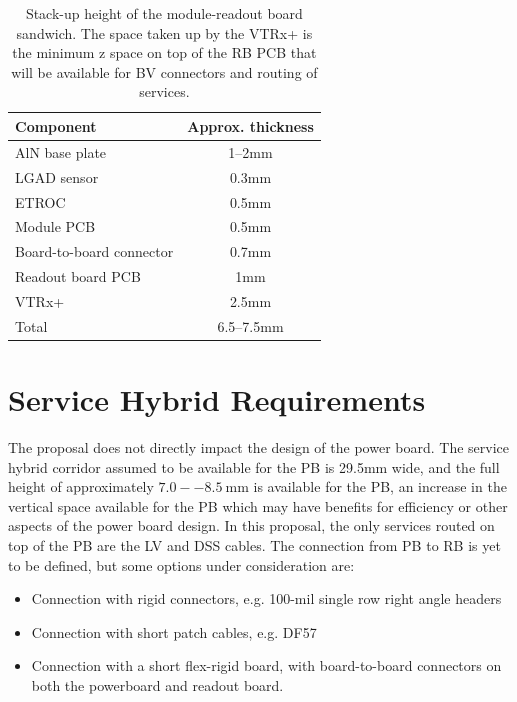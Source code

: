 \documentclass[11pt]{article}
\begin{document}
\begin{table}
  \caption{Stack-up height of the module-readout board sandwich.
    The space taken up by the VTRx+ is the minimum z space on top of the RB PCB that will be available for BV connectors and routing of services.}
  \centering
  \begin{tabular}{ l | c }
    Component                   & Approx. thickness \\ \hline \hline
    AlN base plate              & 1--2mm \\
    LGAD sensor                 & 0.3mm \\
    ETROC                       & 0.5mm \\
    Module PCB                  & 0.5mm \\
    Board-to-board connector    & 0.7mm \\
    Readout board PCB           & 1mm \\
    VTRx+                       & 2.5mm \\ \hline
    Total                       & 6.5--7.5mm \\
  \end{tabular}
  \label{tab:stackup}
\end{table}

\section{Service Hybrid Requirements}

The proposal does not directly impact the design of the power board.
The service hybrid corridor assumed to be available for the PB is 29.5mm wide, and the full height of approximately $7.0--8.5~\mathrm{mm}$ is available for the PB, an increase in the vertical space available for the PB which may have benefits for efficiency or other aspects of the power board design.
In this proposal, the only services routed on top of the PB are the LV and DSS cables.
The connection from PB to RB is yet to be defined, but some options under consideration are:
\begin{itemize}
  \item Connection with rigid connectors, e.g. 100-mil single row right angle headers
  \item Connection with short patch cables, e.g. DF57
  \item Connection with a short flex-rigid board, with board-to-board connectors on both the powerboard and readout board.
\end{itemize}
\end{document}
